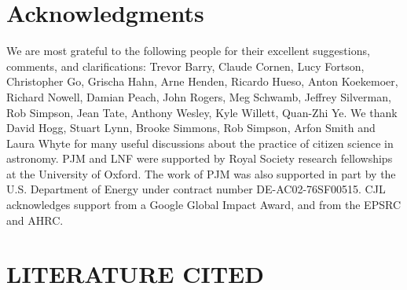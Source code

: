 \documentclass{ar2e}
\begin{document}

\section*{Acknowledgments}

We are most grateful to the following people for their excellent suggestions,
comments, and clarifications: 
Trevor Barry, 
Claude Cornen, 
Lucy Fortson, 
Christopher Go, 
Grischa Hahn, 
Arne Henden,
Ricardo Hueso, 
Anton Koekemoer,
Richard Nowell, 
Damian Peach,  
John Rogers,
Meg Schwamb,
Jeffrey Silverman, 
Rob Simpson, 
Jean Tate, 
Anthony Wesley, 
Kyle Willett, 
Quan-Zhi Ye.
%
We thank David Hogg, Stuart Lynn, Brooke Simmons, Rob Simpson, Arfon Smith and 
Laura Whyte for many useful discussions about the practice of citizen science 
in astronomy.
%
PJM and LNF were supported by Royal Society research fellowships at the
University of Oxford. The work of PJM was also supported in part  by the U.S.
Department of Energy under contract number DE-AC02-76SF00515. CJL acknowledges
support from a Google Global Impact Award, and from the EPSRC and AHRC. 



\section{LITERATURE CITED}




\end{document}
